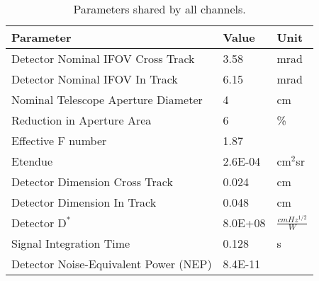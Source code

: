\begin{table} 
\begin{tabular}{lll}
Parameter & Value & Unit\\
\hline
Detector Nominal IFOV Cross Track & 3.58 & mrad \\
Detector Nominal IFOV In Track & 6.15 & mrad \\
Nominal Telescope Aperture Diameter & 4 & cm\\
Reduction in Aperture Area & 6 & \% \\
Effective F number & 1.87 & \\
Etendue & 2.6E-04 & cm$^2$sr \\
Detector Dimension Cross Track & 0.024 & cm \\
Detector Dimension In Track & 0.048 & cm \\
Detector $\mathrm{D^*}$ & 8.0E+08 & $\frac{cmHz^{1/2}}{W}$ \\
Signal Integration Time & 0.128 & s \\
Detector Noise-Equivalent Power (NEP) & 8.4E-11 & \\
\hline
\end{tabular}
\caption{\label{tab:parameters_shared} Parameters shared by all channels.}
\end{table}



